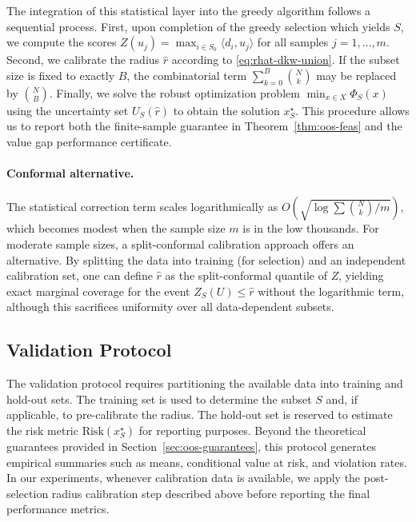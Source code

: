 \documentclass[accepted]{uai2026}
\theoremstyle{plain}
\theoremstyle{definition}
\theoremstyle{remark}
\begin{document}
The integration of this statistical layer into the greedy algorithm follows a sequential process. First, upon completion of the greedy selection which yields $S$, we compute the scores $Z(u_j)=\max_{i\in S_0}\langle d_i,u_j\rangle$ for all samples $j=1,\dots,m$. Second, we calibrate the radius $\widehat r$ according to \eqref{eq:rhat-dkw-union}. If the subset size is fixed to exactly $B$, the combinatorial term $\sum_{k=0}^B\binom{N}{k}$ may be replaced by $\binom{N}{B}$. Finally, we solve the robust optimization problem $\min_{x\in X}\Phi_S(x)$ using the uncertainty set $U_S(\widehat r)$ to obtain the solution $x_S^\star$. This procedure allows us to report both the finite-sample guarantee in Theorem~\ref{thm:oos-feas} and the value gap performance certificate.

\paragraph{Conformal alternative.}
The statistical correction term scales logarithmically as $O(\sqrt{\log \sum \binom{N}{k}/m})$, which becomes modest when the sample size $m$ is in the low thousands. For moderate sample sizes, a split-conformal calibration approach offers an alternative. By splitting the data into training (for selection) and an independent calibration set, one can define $\widehat r$ as the split-conformal quantile of $Z$, yielding exact marginal coverage for the event $Z_S(U)\le \widehat r$ without the logarithmic term, although this sacrifices uniformity over all data-dependent subsets.

\subsection{Validation Protocol}
\label{sec:validacion}

The validation protocol requires partitioning the available data into training and hold-out sets. The training set is used to determine the subset $S$ and, if applicable, to pre-calibrate the radius. The hold-out set is reserved to estimate the risk metric $\mathrm{Risk}(x_S^\star)$ for reporting purposes. Beyond the theoretical guarantees provided in Section~\ref{sec:oos-guarantees}, this protocol generates empirical summaries such as means, conditional value at risk, and violation rates. In our experiments, whenever calibration data is available, we apply the post-selection radius calibration step described above before reporting the final performance metrics.
\end{document}
